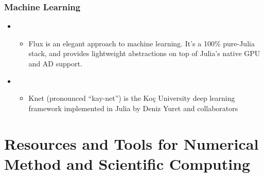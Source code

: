 \documentclass[letterpaper,10pt,english]{sphinxmanual}
\begin{document}
\subsubsection{Machine Learning}
\label{\detokenize{resource/programing/julia_basic:machine-learning}}\begin{itemize}
\item {} 
\begin{itemize}
\item {} 
Flux is an elegant approach to machine learning. It’s a 100\%
pure-Julia stack, and provides lightweight abstractions on top of
Julia’s native GPU and AD support.

\end{itemize}

\item {} 
\begin{itemize}
\item {} 
Knet (pronounced “kay-net”) is the Koç University deep learning
framework implemented in Julia by Deniz Yuret and collaborators

\end{itemize}

\end{itemize}


\section{Resources and Tools for Numerical Method and Scientific Computing}
\label{\detokenize{resource/programing/numerical_method:resources-and-tools-for-numerical-method-and-scientific-computing}}\label{\detokenize{resource/programing/numerical_method::doc}}
\end{document}
